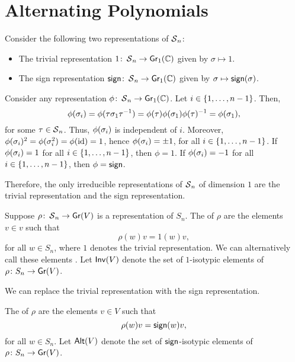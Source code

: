 \chapter{Alternating Polynomials}

Consider the following two representations of \(\operatorname{\mathcal{S}}_n\):
\begin{itemize}
    \item The trivial representation \(1 \colon \operatorname{\mathcal{S}}_n \to \operatorname{\mathsf{Gr}}_1(\mathbb{C})\) given by \(\sigma \mapsto 1\).
    \item The sign representation \(\operatorname{\mathsf{sign}} \colon \operatorname{\mathcal{S}}_n \to \operatorname{\mathsf{Gr}}_1(\mathbb{C})\) given by \(\sigma \mapsto \operatorname{\mathsf{sign}}(\sigma)\).
\end{itemize}

Consider any representation \(\phi \colon  \operatorname{\mathcal{S}}_n \to \operatorname{\mathsf{Gr}}_1(\mathbb{C})\).
Let \(i \in \interval{n-1}\).
Then,
\begin{equation}
    \phi(\sigma_{i}) = \phi(\tau \sigma_{1} \tau^{-1}) = \phi(\tau) \phi(\sigma_{1}) \phi(\tau)^{-1} = \phi(\sigma_{1}),
\end{equation}
for some \(\tau \in \operatorname{\mathcal{S}}_n\).
Thus, \(\phi(\sigma_{i})\) is independent of \(i\).
Moreover, \(\phi(\sigma_{i})^2 = \phi(\sigma_{i}^2) = \phi(\operatorname{id}) = 1\), hence \(\phi(\sigma_{i}) = \pm 1\), for all \(i \in \interval{n-1}\).
If \(\phi(\sigma_{i}) = 1\) for all \(i \in \interval{n-1}\), then \(\phi = 1\).
If \(\phi(\sigma_{i}) = -1\) for all \(i \in \interval{n-1}\), then \(\phi = \operatorname{\mathsf{sign}}\).

Therefore, the only irreducible representations of \(\operatorname{\mathcal{S}}_n\) of dimension \(1\) are the trivial representation and the sign representation.

Suppose \(\rho \colon \operatorname{\mathcal{S}}_n \to \operatorname{\mathsf{Gr}}(V)\) is a representation of \(S_n\).
The  of \(\rho\) are the elements \(v \in v\) such that
\begin{equation}
    \rho(w) v = 1(w) v, 
\end{equation}
for all \(w \in S_n\), where \(1\) denotes the trivial representation.
We can alternatively call these elements .
Let \(\operatorname{\mathsf{Inv}}(V)\) denote the set of \(1\)-isotypic elements of \(\rho \colon S_n \to \operatorname{\mathsf{Gr}}(V)\).

We can replace the trivial representation with the sign representation.

The  of \(\rho\) are the elements \(v \in V\) such that
\begin{equation}
    \rho(w) v = \operatorname{\mathsf{sign}}(w) v,
\end{equation}
for all \(w \in S_n\).
Let \(\operatorname{\mathsf{Alt}}(V)\) denote the set of \(\operatorname{\mathsf{sign}}\)-isotypic elements of \(\rho \colon S_n \to \operatorname{\mathsf{Gr}}(V)\).

